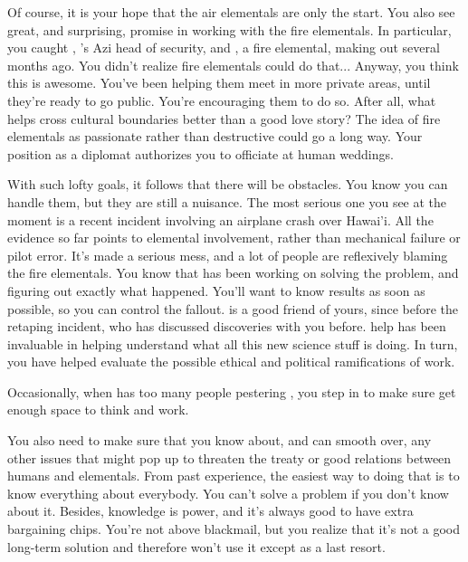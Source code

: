 \documentclass[char]{elementals}
\begin{document}
Of course, it is your hope that the air elementals are only the start.  You also see great, and surprising, promise in working with the fire elementals.  In particular, you caught \cRomeo{\intro}, \cLeader{}'s Azi head of security, and \cJuliet{\intro}, a fire elemental, making out several months ago.  You didn't realize fire elementals could do that...  Anyway, you think this is awesome.  You've been helping them meet in more private areas, until they're ready to go public.  You're encouraging them to do so.  After all, what helps cross cultural boundaries better than a good love story?  The idea of fire elementals as passionate rather than destructive could go a long way.  Your position as a diplomat authorizes you to officiate at human weddings.

With such lofty goals, it follows that there will be obstacles.  You know you can handle them, but they are still a nuisance.  The most serious one you see at the moment is a recent incident involving an airplane crash over Hawai'i.  All the evidence so far points to elemental involvement, rather than mechanical failure or pilot error.  It's made a serious mess, and a lot of people are reflexively blaming the fire elementals.  You know that \cScientist{\intro} has been working on solving the problem, and figuring out exactly what happened.  You'll want to know \cScientist{\their} results as soon as possible, so you can control the fallout.  \cScientist{} is a good friend of yours, since before the retaping incident, who has discussed \cScientist{\their} discoveries with you before.  \cScientist{\Their} help has been invaluable in helping understand what all this new science stuff is doing.  In turn, you have helped \cScientist{} evaluate the possible ethical and political ramifications of \cScientist{\their} work.

Occasionally, when \cScientist{} has too many people pestering \cScientist{\them}, you step in to make sure \cScientist{\they} get enough space to think and work.


You also need to make sure that you know about, and can smooth over, any other issues that might pop up to threaten the treaty or good relations between humans and elementals.  From past experience, the easiest way to doing that is to know everything about everybody.  You can't solve a problem if you don't know about it.  Besides, knowledge is power, and it's always good to have extra bargaining chips.  You're not above blackmail, but you realize that it's not a good long-term solution and therefore won't use it except as a last resort.
\end{document}

